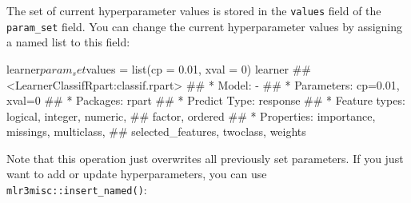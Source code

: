 \documentclass[
  11pt,
  parskip=half,
  DIV=calc,
  BCOR=10mm,
  x11names]{scrbook}
\newenvironment{Shaded}{}{}
\newcommand{\DataTypeTok}[1]{#1}
\newcommand{\DecValTok}[1]{#1}
\newcommand{\FloatTok}[1]{#1}
\newcommand{\KeywordTok}[1]{\textcolor[rgb]{0.00,0.00,1.00}{#1}}
\newcommand{\NormalTok}[1]{#1}
\newcommand{\OperatorTok}[1]{#1}
\newcommand{\StringTok}[1]{\textcolor[rgb]{0.00,0.50,0.50}{#1}}
\begin{document}
\begin{Shaded}
\end{Shaded}

The set of current hyperparameter values is stored in the \texttt{values} field of the \texttt{param\_set} field.
You can change the current hyperparameter values by assigning a named list to this field:

\begin{Shaded}
\begin{Highlighting}[]
\NormalTok{learner}\OperatorTok{$}\NormalTok{param_set}\OperatorTok{$}\NormalTok{values =}\StringTok{ }\KeywordTok{list}\NormalTok{(}\DataTypeTok{cp =} \FloatTok{0.01}\NormalTok{, }\DataTypeTok{xval =} \DecValTok{0}\NormalTok{)}
\NormalTok{learner}
\NormalTok{## <LearnerClassifRpart:classif.rpart>}
\NormalTok{## * Model: -}
\NormalTok{## * Parameters: cp=0.01, xval=0}
\NormalTok{## * Packages: rpart}
\NormalTok{## * Predict Type: response}
\NormalTok{## * Feature types: logical, integer, numeric,}
\NormalTok{##   factor, ordered}
\NormalTok{## * Properties: importance, missings, multiclass,}
\NormalTok{##   selected_features, twoclass, weights}
\end{Highlighting}
\end{Shaded}

Note that this operation just overwrites all previously set parameters.
If you just want to add or update hyperparameters, you can use \texttt{mlr3misc::insert\_named()}:
\end{document}
